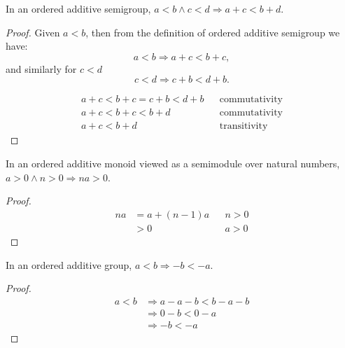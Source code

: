 \begin{lemma}
	In an ordered additive semigroup, $a < b \wedge c < d \Rightarrow a + c < b + d$.
\end{lemma}

\begin{proof}
	Given $a < b$, then from the definition of ordered additive semigroup we have:
	\[ a < b \Rightarrow a + c < b + c, \]
	and similarly for $c < d$
	\[ c < d \Rightarrow c + b < d + b. \]

	\begin{align*}
		a + c < b + c = c + b < d + b && \text{commutativity}\\
		a + c < b + c < b + d && \text{commutativity}\\
		a + c < b + d && \text{transitivity}
	\end{align*}
\end{proof}

\begin{lemma}
	In an ordered additive monoid viewed as a semimodule over natural numbers,
	$a > 0 \wedge n > 0 \Rightarrow na > 0$.
\end{lemma}

\begin{proof}
	\begin{align*}
		na &= a + (n - 1)a && n > 0\\
		   &> 0 && a > 0
	\end{align*}
\end{proof}

\begin{lemma}
	In an ordered additive group, $a < b \Rightarrow -b < -a$.
\end{lemma}

\begin{proof}
	\begin{align*}
		a < b &\Rightarrow a - a - b < b - a - b\\
		&\Rightarrow 0 - b < 0 - a\\
		&\Rightarrow -b < -a
	\end{align*}
\end{proof}
